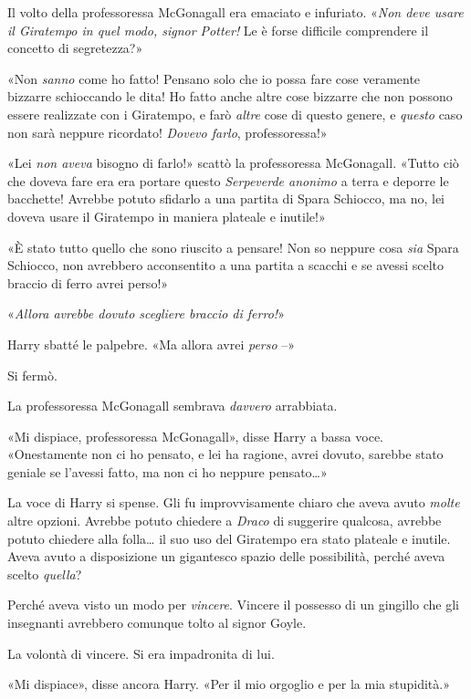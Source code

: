 Il volto della professoressa McGonagall era emaciato e infuriato. «\textit{Non deve usare il Giratempo in quel modo, signor Potter!} Le è forse difficile comprendere il concetto di segretezza?»

«Non \textit{sanno} come ho fatto! Pensano solo che io possa fare cose veramente bizzarre schioccando le dita! Ho fatto anche altre cose bizzarre che non possono essere realizzate con i Giratempo, e farò \textit{altre} cose di questo genere, e \textit{questo} caso non sarà neppure ricordato! \textit{Dovevo farlo}, professoressa!»

«Lei \textit{non aveva} bisogno di farlo!» scattò la professoressa McGonagall. «Tutto ciò che doveva fare era era portare questo \textit{Serpeverde anonimo} a terra e deporre le bacchette! Avrebbe potuto sfidarlo a una partita di Spara Schiocco, ma no, lei doveva usare il Giratempo in maniera plateale e inutile!»

«È stato tutto quello che sono riuscito a pensare! Non so neppure cosa \textit{sia} Spara Schiocco, non avrebbero acconsentito a una partita a scacchi e se avessi scelto braccio di ferro avrei perso!»

«\textit{Allora avrebbe dovuto scegliere braccio di ferro!}»

Harry sbatté le palpebre. «Ma allora avrei \textit{perso} –»

Si fermò.

La professoressa McGonagall sembrava \textit{davvero} arrabbiata.

«Mi dispiace, professoressa McGonagall», disse Harry a bassa voce. «Onestamente non ci ho pensato, e lei ha ragione, avrei dovuto, sarebbe stato geniale se l’avessi fatto, ma non ci ho neppure pensato…»

La voce di Harry si spense. Gli fu improvvisamente chiaro che aveva avuto \textit{molte} altre opzioni. Avrebbe potuto chiedere a \textit{Draco} di suggerire qualcosa, avrebbe potuto chiedere alla folla… il suo uso del Giratempo era stato plateale e inutile. Aveva avuto a disposizione un gigantesco spazio delle possibilità, perché aveva scelto \textit{quella}?

Perché aveva visto un modo per \textit{vincere}. Vincere il possesso di un gingillo che gli insegnanti avrebbero comunque tolto al signor Goyle.

La volontà di vincere. Si era impadronita di lui.

«Mi dispiace», disse ancora Harry. «Per il mio orgoglio e per la mia stupidità.»

